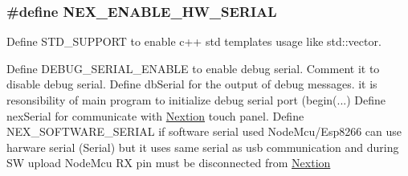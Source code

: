 \subsubsection[{N\+E\+X\+\_\+\+E\+N\+A\+B\+L\+E\+\_\+\+H\+W\+\_\+\+S\+E\+R\+I\+A\+L}]{\setlength{\rightskip}{0pt plus 5cm}\#define N\+E\+X\+\_\+\+E\+N\+A\+B\+L\+E\+\_\+\+H\+W\+\_\+\+S\+E\+R\+I\+A\+L}\label{group___configuration_ga5446baadd7f775404556a957cf6d03fc}


Define S\+T\+D\+\_\+\+S\+U\+P\+P\+O\+R\+T to enable c++ std templates usage like std\+::vector. 

Define D\+E\+B\+U\+G\+\_\+\+S\+E\+R\+I\+A\+L\+\_\+\+E\+N\+A\+B\+L\+E to enable debug serial. Comment it to disable debug serial. Define db\+Serial for the output of debug messages. it is resonsibility of main program to initialize debug serial port (begin(...) Define nex\+Serial for communicate with \hyperlink{class_nextion}{Nextion} touch panel. Define N\+E\+X\+\_\+\+S\+O\+F\+T\+W\+A\+R\+E\+\_\+\+S\+E\+R\+I\+A\+L if software serial used Node\+Mcu/\+Esp8266 can use harware serial (Serial) but it uses same serial as usb communication and during S\+W upload Node\+Mcu R\+X pin must be disconnected from \hyperlink{class_nextion}{Nextion} 